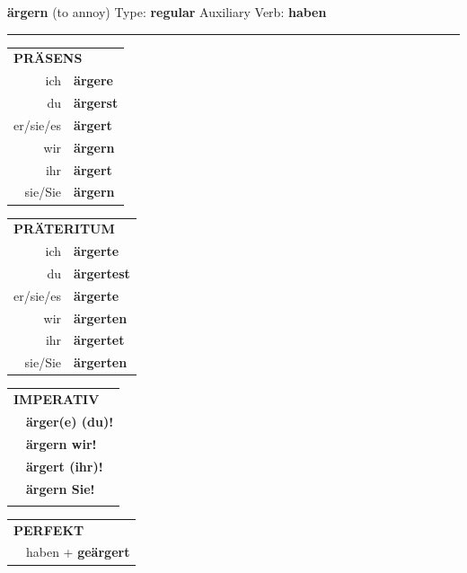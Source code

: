 \documentclass[10pt,a4paper]{revtex4-2}
\begin{document}
\begin{verbbox}
    {\Large \bf ärgern} (to annoy) \hfill Type: \textbf{regular} \hfill Auxiliary Verb: \textbf{haben} 
    
     \vspace{5pt}

    \hrule
    
    \vspace{5pt}

  \begin{tabular}{rl}
     \multicolumn{2}{l}{\textbf{PRÄSENS} }\\
    ich & \textbf{ärgere}\\
    du & \textbf{ärgerst}\\
    er/sie/es & \textbf{ärgert}\\
    wir & \textbf{ärgern}\\
    ihr & \textbf{ärgert}\\
    sie/Sie & \textbf{ärgern}\\
  \end{tabular}
  \hfill
     \begin{tabular}{rl}
    \multicolumn{2}{l}{\textbf{PRÄTERITUM} }\\
    ich & \textbf{ärgerte}\\
    du & \textbf{ärgertest}\\
    er/sie/es & \textbf{ärgerte}\\
    wir & \textbf{ärgerten}\\
    ihr & \textbf{ärgertet}\\
    sie/Sie & \textbf{ärgerten}\\
  \end{tabular}
  \hfill
  \begin{tabular}{rl}
     \multicolumn{2}{l}{\textbf{IMPERATIV} }\\
   & \textbf{ärger(e) (du)!}\\
   & \textbf{ärgern wir!}\\
   & \textbf{ärgert (ihr)!}\\
   & \textbf{ärgern Sie!}\\
   & \vspace{10pt}
  \end{tabular}

    \vspace{10pt}

 \begin{tabular}{rl}
     \multicolumn{2}{l}{\textbf{PERFEKT}}\\
   & haben + \textbf{geärgert}\\
  \end{tabular}
\hfill
   \begin{tabular}{rl}
   

\end{tabular}
\end{verbbox}
\end{document}
